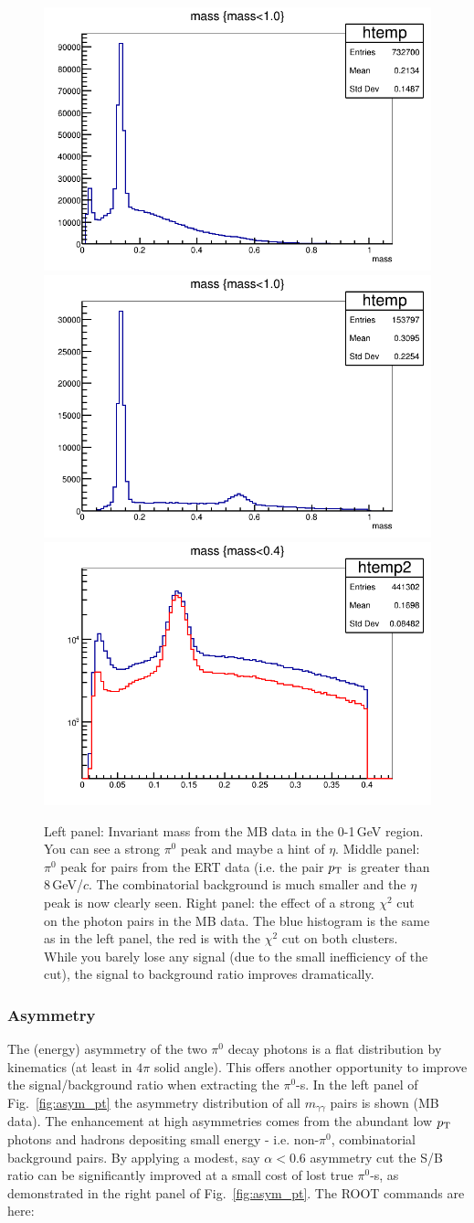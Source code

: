 \documentclass[pdftex,12pt,letter]{article}
\newcommand{\piz}{\mbox{$\pi^0$}\xspace}
\newcommand{\pt}{\mbox{$p_{\rm T}$}\xspace}
\newcommand{\gev}{\mbox{GeV}\xspace}
\newcommand{\gevc}{\mbox{GeV/$c$}\xspace}
\newcommand{\mgg}{\mbox{$m_{\gamma\gamma}$}\xspace}
\begin{document}
\begin{center}
\begin{figure}[htbp]
  \includegraphics[width=0.33\linewidth]{figs/mbinvmass.png}
  \includegraphics[width=0.33\linewidth]{figs/ertinvmass.png}
  \includegraphics[width=0.33\linewidth]{figs/chi2mbinvmass.png}
  \caption{Left panel: Invariant mass from the MB data
    in the 0-1\,\gev region.  You can see a strong \piz peak
    and maybe a hint of $\eta$.
    Middle panel: \piz peak for pairs 
    from the ERT data (i.e. the pair \pt is greater than 8\,\gevc.  
    The combinatorial background is much smaller and the $\eta$ peak
    is now clearly seen.
    Right panel: the effect of a strong $\chi^2$ cut on the photon
    pairs in the MB data.  The blue histogram is the same as in the
    left panel, the red is with the $\chi^2$ cut on both clusters.
    While you barely lose any signal (due to the small inefficiency of
    the cut), the signal to background ratio improves dramatically.
  }
    \label{fig:invmass}
\end{figure}
\end{center}

\subsubsection{Asymmetry}
The (energy) asymmetry of the two \piz decay photons is a flat
distribution by kinematics (at least in $4\pi$ solid angle).  This
offers another opportunity to improve the signal/background ratio when
extracting the \piz-s.   
In the left panel of Fig.~\ref{fig:asym_pt} the asymmetry distribution
of all \mgg pairs is shown (MB data).  The enhancement at high
asymmetries comes from the abundant low \pt photons and hadrons
depositing small energy - i.e. non-\piz, combinatorial background
pairs.  By applying a modest, say $\alpha<0.6$ asymmetry cut the S/B
ratio can be significantly improved at a small cost of lost true
\piz-s, as demonstrated in the right panel of Fig.~\ref{fig:asym_pt}. 
The ROOT commands are here:
\end{document}
